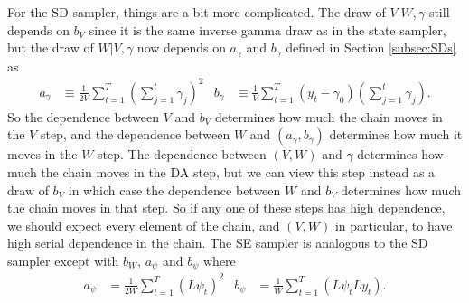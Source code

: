 \documentclass{article}
\begin{document}
For the SD sampler, things are a bit more complicated. The draw of $V|W,\gamma$ still depends on $b_V$ since it is the same inverse gamma draw as in the state sampler, but the draw of $W|V,\gamma$ now depends on $a_\gamma$ and $b_\gamma$ defined in Section \ref{subsec:SDs} as
\begin{align*}
  a_\gamma &\equiv \frac{1}{2V}\sum_{t=1}^T\left(\sum_{j=1}^t\gamma_j\right)^2&
  b_\gamma &\equiv \frac{1}{V}\sum_{t=1}^T(y_t-\gamma_0)\left(\sum_{j=1}^t\gamma_j\right).
\end{align*}
So the dependence between $V$ and $b_V$ determines how much the chain moves in the $V$ step, and the dependence between $W$ and $(a_\gamma , b_\gamma)$ determines how much it moves in the $W$ step. The dependence between $(V,W)$ and $\gamma$ determines how much the chain moves in the DA step, but we can view this step instead as a draw of $b_V$ in which case the dependence between $W$ and $b_V$ determines how much the chain moves in that step. So if any one of these steps has high dependence, we should expect every element of the chain, and $(V,W)$ in particular, to have high serial dependence in the chain. The SE sampler is analogous to the SD sampler except with $b_W$, $a_\psi$ and $b_\psi$ where
\begin{align*}
  a_\psi&=\frac{1}{2W}\sum_{t=1}^T(L\psi_t)^2&
  b_\psi&=\frac{1}{W}\sum_{t=1}^T(L\psi_tLy_t).
\end{align*}
\end{document}
